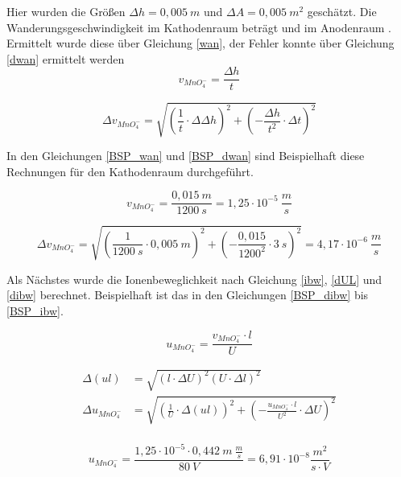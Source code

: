 Hier wurden die Größen $\Delta h=0,005\ m$ und $\Delta A=0,005\ m^2$ geschätzt. 
Die Wanderungsgeschwindigkeit im Kathodenraum beträgt \wanK und im Anodenraum \wanA.
Ermittelt wurde diese über Gleichung \ref{wan}, der Fehler konnte über Gleichung \ref{dwan} ermittelt werden
\begin{equation}
v_{MnO_4^-}=\frac{\Delta h}{t}
\label{wan}
\end{equation} 

\begin{equation}
\Delta v_{MnO_4^-} = \sqrt{\left(\frac{1}{t}\cdot\Delta\Delta h\right)^2 + \left(-\frac{\Delta h}{t^2}\cdot \Delta t\right)^2}
\label{dwan}
\end{equation} 

In den Gleichungen \ref{BSP_wan} und \ref{BSP_dwan} sind Beispielhaft diese Rechnungen für den Kathodenraum durchgeführt.


\begin{equation}
v_{MnO_4^-}=\frac{0,015\ m}{1200\ s} = 1,25 \cdot 10^{-5}\ \frac{m}{s}
\label{BSP_wan}
\end{equation} 

\begin{equation}
\Delta v_{MnO_4^-} = \sqrt{\left(\frac{1}{1200\ s}\cdot0,005\ m\right)^2 + \left(-\frac{0,015}{1200^2}\cdot 3\ s\right)^2} = 4,17 \cdot 10^{-6}\ \frac{m}{s} 
\label{BSP_dwan}
\end{equation} 

Als Nächstes wurde die Ionenbeweglichkeit nach Gleichung \ref{ibw}, \ref{dUL} und \ref{dibw} berechnet. Beispielhaft ist das in den Gleichungen \ref{BSP_dibw} bis \ref{BSP_ibw}.

\begin{equation}
u_{MnO_4^-} = \frac{v_{MnO_4^-}\cdot l}{U}
\label{ibw}
\end{equation} 

\begin{align}
\Delta (ul) &= \sqrt{(l\cdot\Delta U)^2 (U\cdot\Delta l)^2} \label{dUL}\\
\Delta u_{MnO_4^-} &= \sqrt{ \left(\frac{1}{U}\cdot\Delta (ul)\right)^2 + \left(-\frac{u_{MnO_4^-}\cdot l}{U^2}\cdot\Delta U\right)^2}\label{dibw}\\
\end{align}


\begin{equation}
u_{MnO_4^-} = \frac{1,25\cdot 10^{-5}\cdot 0,442\ m\ \frac{m}{s}}{80\ V} = 6,91\cdot 10^{-8}\frac{m^2}{s\cdot V}
\label{BSP_dibw}
\end{equation}


